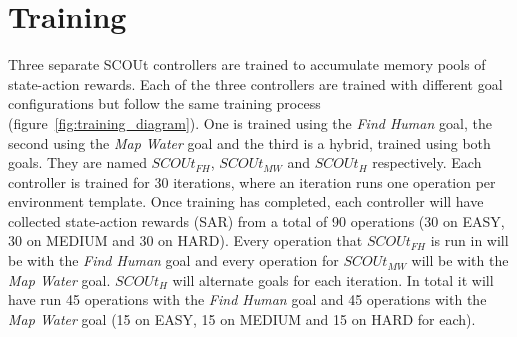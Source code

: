 \section{Training} \label{sec:training}
Three separate SCOUt controllers are trained to accumulate memory pools of state-action rewards.
Each of the three controllers are trained with different goal configurations but follow the same training process (figure~\ref{fig:training_diagram}).
One is trained using the \textit{Find Human} goal, the second using the \textit{Map Water} goal and the third is a hybrid, trained using both goals.
They are named $SCOUt_{FH}$, $SCOUt_{MW}$ and $SCOUt_{H}$ respectively.
Each controller is trained for 30 iterations, where an iteration runs one operation per environment template.
Once training has completed, each controller will have collected state-action rewards (SAR) from a total of 90 operations (30 on EASY, 30 on MEDIUM and 30 on HARD).
Every operation that $SCOUt_{FH}$ is run in will be with the \textit{Find Human} goal and every operation for $SCOUt_{MW}$ will be with the \textit{Map Water} goal.
$SCOUt_{H}$ will alternate goals for each iteration.
In total it will have run 45 operations with the \textit{Find Human} goal and 45 operations with the \textit{Map Water} goal (15 on EASY, 15 on MEDIUM and 15 on HARD for each).

